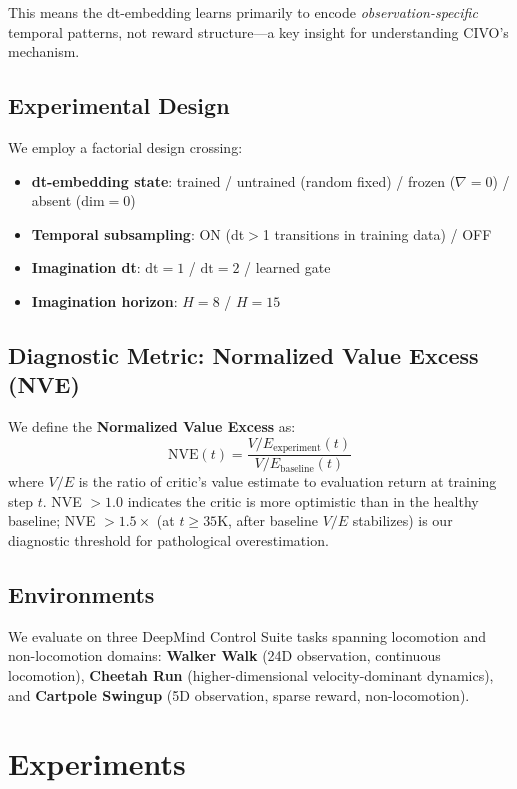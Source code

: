 \documentclass[10pt,letterpaper]{article}
\begin{document}
This means the dt-embedding learns primarily to encode \emph{observation-specific} temporal patterns, not reward structure---a key insight for understanding CIVO's mechanism.

\subsection{Experimental Design}

We employ a factorial design crossing:
\begin{itemize}
    \item \textbf{dt-embedding state}: trained / untrained (random fixed) / frozen ($\nabla=0$) / absent ($\mathrm{dim}=0$)
    \item \textbf{Temporal subsampling}: ON (dt$>$1 transitions in training data) / OFF
    \item \textbf{Imagination dt}: $\mathrm{dt}=1$ / $\mathrm{dt}=2$ / learned gate
    \item \textbf{Imagination horizon}: $H=8$ / $H=15$
\end{itemize}

\subsection{Diagnostic Metric: Normalized Value Excess (NVE)}

We define the \textbf{Normalized Value Excess} as:
\[
\mathrm{NVE}(t) = \frac{V/E_{\text{experiment}}(t)}{V/E_{\text{baseline}}(t)}
\]
where $V/E$ is the ratio of critic's value estimate to evaluation return at training step $t$.
NVE $> 1.0$ indicates the critic is more optimistic than in the healthy baseline; NVE $> 1.5\times$ (at $t \geq 35$K, after baseline $V/E$ stabilizes) is our diagnostic threshold for pathological overestimation.

\subsection{Environments}

We evaluate on three DeepMind Control Suite tasks spanning locomotion and non-locomotion domains:
\textbf{Walker Walk} (24D observation, continuous locomotion),
\textbf{Cheetah Run} (higher-dimensional velocity-dominant dynamics), and
\textbf{Cartpole Swingup} (5D observation, sparse reward, non-locomotion).

\section{Experiments}
\end{document}
